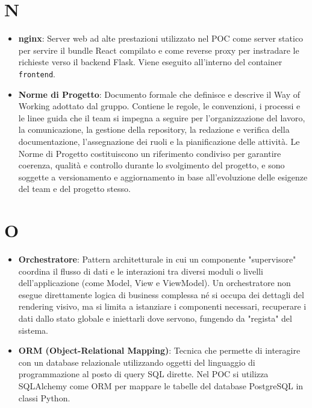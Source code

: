 \documentclass[11pt,a4paper]{article}
\begin{document}
\section*{N}
\begin{itemize}
\item \textbf{nginx}: Server web ad alte prestazioni utilizzato nel POC come server statico per servire il bundle React compilato e come reverse proxy per instradare le richieste verso il backend Flask. Viene eseguito all'interno del container \texttt{frontend}.

\item \textbf{Norme di Progetto}: Documento formale che definisce e descrive il Way of Working adottato dal gruppo. Contiene le regole, le convenzioni, i processi e le linee guida che il team si impegna a seguire per l’organizzazione del lavoro, la comunicazione, la gestione della repository, la redazione e verifica della documentazione, l’assegnazione dei ruoli e la pianificazione delle attività. Le Norme di Progetto costituiscono un riferimento condiviso per garantire coerenza, qualità e controllo durante lo svolgimento del progetto, e sono soggette a versionamento e aggiornamento in base all’evoluzione delle esigenze del team e del progetto stesso.

\end{itemize}

\newpage

\section*{O}
\begin{itemize}
\item \textbf{Orchestratore}: Pattern architetturale in cui un componente "supervisore" coordina il flusso di dati e le interazioni tra diversi moduli o livelli dell'applicazione (come Model, View e ViewModel). Un orchestratore non esegue direttamente logica di business complessa né si occupa dei dettagli del rendering visivo, ma si limita a istanziare i componenti necessari, recuperare i dati dallo stato globale e iniettarli dove servono, fungendo da "regista" del sistema.

\item \textbf{ORM (Object-Relational Mapping)}: Tecnica che permette di interagire con un database relazionale utilizzando oggetti del linguaggio di programmazione al posto di query SQL dirette. Nel POC si utilizza SQLAlchemy come ORM per mappare le tabelle del database PostgreSQL in classi Python.
\end{itemize}
\end{document}
